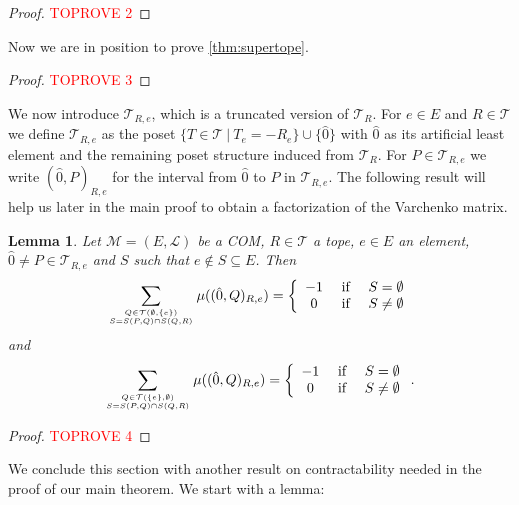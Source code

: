 \documentclass[12pt]{amsart}
\def\Tscr{{\mathcal T}}
\def\M{{\mathcal M}}
\theoremstyle{plain}
\newtheorem{Lemma}{Lemma}
\numberwithin{Lemma}{\DefaultNumberTheoremWithin}
\numberwithin{Claim}{\DefaultNumberTheoremWithin}
\numberwithin{Theorem}{\DefaultNumberTheoremWithin}
\numberwithin{Corollary}{\DefaultNumberTheoremWithin}
\numberwithin{Proposition}{\DefaultNumberTheoremWithin}
\numberwithin{Conjecture}{\DefaultNumberTheoremWithin}
\numberwithin{Situation}{\DefaultNumberTheoremWithin}
\numberwithin{Note}{\DefaultNumberTheoremWithin}
\theoremstyle{definition}
\numberwithin{Definition}{\DefaultNumberTheoremWithin}
\theoremstyle{definition}
\numberwithin{Question}{\DefaultNumberTheoremWithin}
\theoremstyle{definition}
\numberwithin{Problem}{\DefaultNumberTheoremWithin}
\theoremstyle{remark} \newtheorem{Remark}{Remark}
\numberwithin{Remark}{\DefaultNumberTheoremWithin}
\theoremstyle{remark}
\numberwithin{Example}{\DefaultNumberTheoremWithin}
\numberwithin{Case}{Lemma}
\numberwithin{Step}{Lemma}
\begin{document}
\begin{proof}\textcolor{red}{TOPROVE 2}\end{proof}

Now we are in position to prove \ref{thm:supertope}.

\begin{proof}\textcolor{red}{TOPROVE 3}\end{proof}

We now introduce $\Tscr_{R,e}$, which is a truncated version of $\Tscr_R$. For $e \in E$ and $R \in \Tscr$ we define $\Tscr_{R,e}$ as the poset 
$\{ T \in \Tscr~|~T_e = -R_e\}\cup \{ \hat{0}\}$ 
with $\hat{0}$ as its artificial least element and the remaining poset 
structure induced from $\Tscr_R$.
For $P \in \Tscr_{R,e}$ we write $(\hat{0},P)_{R,e}$ for the interval from
$\hat{0}$ to $P$ in $\Tscr_{R,e}$. The following result will help us later in the main proof to obtain a factorization of the Varchenko matrix.

\begin{Lemma}
  \label{cor:crucial}
Let $\M=(E,\mathcal{L})$ be a COM, $R \in \Tscr$ a tope, $e\in E$ an element, $\hat{0} \neq P \in \Tscr_{R,e}$ and $S$ such that $e \not\in S\subseteq E$. Then 
\begin{align}\label{cruc1}
  \sum_{\genfrac{}{}{0pt}{}{Q \in \Tscr(\emptyset,\{e\})}{ S= S(P,Q) \cap S(Q,R)}}  \mu((\hat{0},Q)_{R,e}) = \left\{ \begin{array}{ccc} -1 & \mbox{~if~} & S = \emptyset \\ 
                                       0 & \mbox{~if~} & S \neq \emptyset 
                  \end{array} \right. 
\end{align}
and 
\begin{align}\label{cruc2}
  \sum_{\genfrac{}{}{0pt}{}{Q \in \Tscr(\{e\},\emptyset)}{ S= S(P,Q) \cap S(Q,R)}}  \mu((\hat{0},Q)_{R,e}) = \left\{ \begin{array}{ccc} -1 & \mbox{~if~} & S = \emptyset \\ 
                                       0 & \mbox{~if~} & S \neq \emptyset 
                  \end{array} \right. .
\end{align}
\end{Lemma}

\begin{proof}\textcolor{red}{TOPROVE 4}\end{proof}


We conclude this section with another result on contractability needed in the proof of our main theorem. We start with a lemma:
\end{document}
